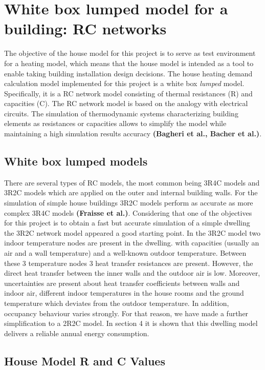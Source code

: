 \section{White box lumped model for a building: RC networks}

The objective of the house model for this project is to serve as test environment for a heating model, which means that the house model is intended as a tool to enable taking building installation design decisions. The house heating demand calculation model implemented for this project is a white box \emph{lumped} model. Specifically, it is a RC network model consisting of thermal resistances (R) and capacities (C). The RC network model is based on the analogy with electrical circuits. The simulation of thermodynamic systems characterizing building elements as resistances or capacities allows to simplify the model while maintaining a high simulation results accuracy \textbf{(Bagheri et al.\cite{en11040890}, Bacher et al\cite{Bacher}.)}.  

\subsection{White box lumped models}

There are several types of RC models, the most common being 3R4C models and 3R2C models which are applied on the outer and internal building walls. For the simulation of simple house buildings 3R2C models perform as accurate as more complex 3R4C models \textbf{(Fraisse et al.\cite{Fraisse})}. Considering that one of the objectives for this project is to obtain a fast but accurate simulation of a simple dwelling the 3R2C network model appeared a good starting point. In the 3R2C model two indoor temperature nodes are present in the dwelling. with capacities (usually an air and a wall temperature) and a well-known outdoor temperature. Between these 3 temperature nodes 3 heat transfer resistances are present. However, the direct heat transfer between the inner walls and the outdoor air is low. Moreover, uncertainties are present about heat transfer coefficients between walls and indoor air, different indoor temperatures in the house rooms and the ground temperature which deviates from the outdoor temperature. In addition, occupancy behaviour varies strongly. For that reason, we have made a further simplification to a 2R2C model. In section 4 it is shown that this dwelling model delivers a reliable annual energy consumption.


\subsection{House Model R and C Values}

